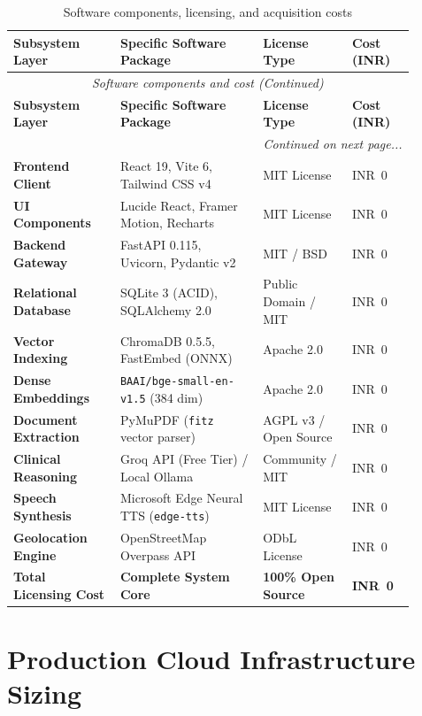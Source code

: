 \small
\begin{longtable}{@{}p{0.24\linewidth} p{0.32\linewidth} p{0.20\linewidth} p{0.14\linewidth}@{}}
\caption{Software components, licensing, and acquisition costs}\label{tab:8_1_software} \\
\toprule
\textbf{Subsystem Layer} & \textbf{Specific Software Package} & \textbf{License Type} & \textbf{Cost (INR)} \\
\midrule
\endfirsthead
\toprule
\multicolumn{4}{c}{\small\textit{Software components and cost (Continued)}} \\[4pt]
\midrule
\textbf{Subsystem Layer} & \textbf{Specific Software Package} & \textbf{License Type} & \textbf{Cost (INR)} \\
\midrule
\endhead
\midrule
\multicolumn{4}{r}{\footnotesize\textit{Continued on next page...}} \\
\bottomrule
\endfoot
\bottomrule
\endlastfoot
\textbf{Frontend Client} & React 19, Vite 6, Tailwind CSS v4 & MIT License & INR~0 \\
\textbf{UI Components} & Lucide React, Framer Motion, Recharts & MIT License & INR~0 \\
\textbf{Backend Gateway} & FastAPI 0.115, Uvicorn, Pydantic v2 & MIT / BSD & INR~0 \\
\textbf{Relational Database} & SQLite 3 (ACID), SQLAlchemy 2.0 & Public Domain / MIT & INR~0 \\
\textbf{Vector Indexing} & ChromaDB 0.5.5, FastEmbed (ONNX) & Apache 2.0 & INR~0 \\
\textbf{Dense Embeddings} & \texttt{BAAI/bge-small-en-v1.5} (384 dim) & Apache 2.0 & INR~0 \\
\textbf{Document Extraction} & PyMuPDF (\texttt{fitz} vector parser) & AGPL v3 / Open Source & INR~0 \\
\textbf{Clinical Reasoning} & Groq API (Free Tier) / Local Ollama & Community / MIT & INR~0 \\
\textbf{Speech Synthesis} & Microsoft Edge Neural TTS (\texttt{edge-tts}) & MIT License & INR~0 \\
\textbf{Geolocation Engine} & OpenStreetMap Overpass API & ODbL License & INR~0 \\
\midrule
\textbf{Total Licensing Cost} & \textbf{Complete System Core} & \textbf{100\% Open Source} & \textbf{INR~0} \\
\bottomrule
\end{longtable}
\normalsize


\section{Production Cloud Infrastructure Sizing}
\label{sec:cloud_sizing}


